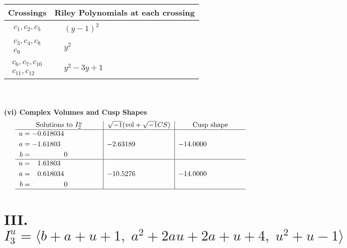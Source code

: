 \documentclass[1p]{elsarticle_modified}
\theoremstyle{definition}
\newcommand{\I}{\sqrt{-1}}
\begin{document}
\begin{tabular}{m{50pt}|m{274pt}}
Crossings & \hspace{64pt}Riley Polynomials at each crossing \\
\hline $$\begin{aligned}c_{1},c_{2},c_{5}\end{aligned}$$&$\begin{aligned}
&(y-1)^2
\end{aligned}$\\
\hline $$\begin{aligned}c_{3},c_{4},c_{8}\\c_{9}\end{aligned}$$&$\begin{aligned}
&y^2
\end{aligned}$\\
\hline $$\begin{aligned}c_{6},c_{7},c_{10}\\c_{11},c_{12}\end{aligned}$$&$\begin{aligned}
&y^2-3 y+1
\end{aligned}$\\
\hline
\end{tabular}\\~\\
\newpage\flushleft \textbf{(vi) Complex Volumes and Cusp Shapes}
$$\begin{array}{c|c|c}  
\text{Solutions to }I^u_{2}& \I (\text{vol} + \sqrt{-1}CS) & \text{Cusp shape}\\
 \hline 
\begin{aligned}
u &= -0.618034\phantom{ +0.000000I} \\
a &= -1.61803\phantom{ +0.000000I} \\
b &= \phantom{-0.000000 } 0\end{aligned}
 & -2.63189\phantom{ +0.000000I} & -14.0000\phantom{ +0.000000I} \\ \hline\begin{aligned}
u &= \phantom{-}1.61803\phantom{ +0.000000I} \\
a &= \phantom{-}0.618034\phantom{ +0.000000I} \\
b &= \phantom{-0.000000 } 0\end{aligned}
 & -10.5276\phantom{ +0.000000I} & -14.0000\phantom{ +0.000000I}\\
 \hline 
 \end{array}$$\newpage\newpage\renewcommand{\arraystretch}{1}
\centering \section*{III. $I^u_{3}= \langle b+a+u+1,\;a^2+2 a u+2 a+u+4,\;u^2+u-1 \rangle$}
\end{document}
